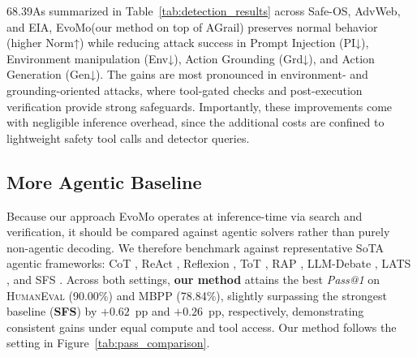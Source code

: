 \documentclass{article} %
\theoremstyle{definition}
\theoremstyle{remark}
\newcommand{\ourmethod}{{\fontfamily{lmtt}\selectfont EvoMo}\xspace}
\begin{document}
68.39As summarized in Table~\ref{tab:detection_results} across Safe-OS, AdvWeb, and EIA, \ourmethod (our method on top of AGrail) preserves normal behavior (higher Norm↑) while reducing attack success in Prompt Injection (PI↓), Environment manipulation (Env↓), Action Grounding (Grd↓), and Action Generation (Gen↓). The gains are most pronounced in environment- and grounding-oriented attacks, where tool-gated checks and post-execution verification provide strong safeguards. Importantly, these improvements come with negligible inference overhead, since the additional costs are confined to lightweight safety tool calls and detector queries.

\subsection{More Agentic Baseline}
Because our approach \ourmethod operates at inference-time via search and verification, it should be compared against agentic solvers rather than purely non-agentic decoding. We therefore benchmark against representative SoTA agentic frameworks: CoT \citep{wei2022chain}, ReAct \citep{yao2023react}, Reflexion \citep{shinn2023reflexion}, ToT \citep{yao2023tree}, RAP \citep{hao2023reasoning}, LLM-Debate \citep{du2023improving}, LATS \citep{zhou2024language}, and SFS \citep{light2025sfs}. Across both settings, \textbf{our method} attains the best \textit{Pass@1} on \textsc{HumanEval} (90.00\%) and \textsc{MBPP} (78.84\%), slightly surpassing the strongest baseline (\textbf{SFS}) by $+0.62$\, pp and $+0.26$\, pp, respectively, demonstrating consistent gains under equal compute and tool access. Our method follows the setting in Figure~\ref{tab:pass_comparison}.
\end{document}
